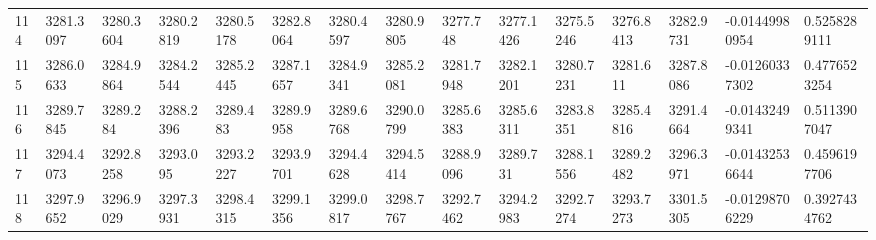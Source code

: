 \begin{landscape}
{\begin{longtable}{@{}lllllllllllllll@{}}
		114                                          & 3281.3097                & 3280.3604                & 3280.2819                & 3280.5178                & 3282.8064                & 3280.4597                & 3280.9805                & 3277.748                 & 3277.1426                & 3275.5246                & 3276.8413                & 3282.9731                & -0.01449980954                                                         & 0.5258289111                                    \\
		115                                          & 3286.0633                & 3284.9864                & 3284.2544                & 3285.2445                & 3287.1657                & 3284.9341                & 3285.2081                & 3281.7948                & 3282.1201                & 3280.7231                & 3281.611                 & 3287.8086                & -0.01260337302                                                         & 0.4776523254                                    \\
		116                                          & 3289.7845                & 3289.284                 & 3288.2396                & 3289.483                 & 3289.9958                & 3289.6768                & 3290.0799                & 3285.6383                & 3285.6311                & 3283.8351                & 3285.4816                & 3291.4664                & -0.01432499341                                                         & 0.5113907047                                    \\
		117                                          & 3294.4073                & 3292.8258                & 3293.095                 & 3293.2227                & 3293.9701                & 3294.4628                & 3294.5414                & 3288.9096                & 3289.731                 & 3288.1556                & 3289.2482                & 3296.3971                & -0.01432536644                                                         & 0.4596197706                                    \\
		118                                          & 3297.9652                & 3296.9029                & 3297.3931                & 3298.4315                & 3299.1356                & 3299.0817                & 3298.7767                & 3292.7462                & 3294.2983                & 3292.7274                & 3293.7273                & 3301.5305                & -0.01298706229                                                         & 0.3927434762                                    \\

\end{longtable}}
\end{landscape}
